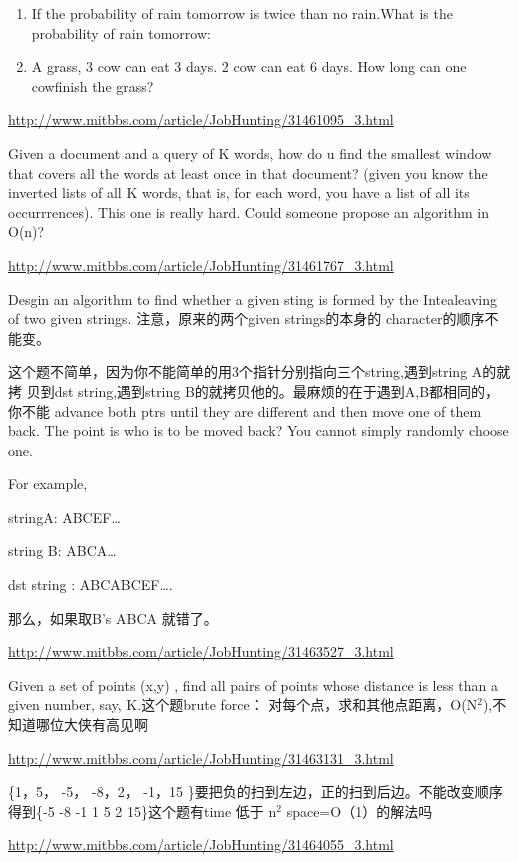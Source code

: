 \documentclass[12pt]{book}
\begin{document}
\begin{enumerate}
\item If the probability of rain tomorrow is twice than no rain.What is the probability of rain tomorrow:

\item A grass, 3 cow can eat 3 days. 2 cow can eat 6 days. How long can one cowfinish the grass?
\end{enumerate}

\url{http://www.mitbbs.com/article/JobHunting/31461095_3.html}

Given a document and a query of K words, how do u find the smallest window 
that covers all the words at least once in that document? (given you know 
the inverted lists of all K words, that is, for each word, you have a list 
of all its occurrrences). This one is really hard. Could someone propose an 
algorithm in O(n)?

\url{http://www.mitbbs.com/article/JobHunting/31461767_3.html}

Desgin an algorithm to find whether a given sting is formed by the 
Intealeaving of two given strings. 注意，原来的两个given strings的本身的
character的顺序不能变。

这个题不简单，因为你不能简单的用3个指针分别指向三个string,遇到string A的就拷
贝到dst string,遇到string B的就拷贝他的。最麻烦的在于遇到A,B都相同的，你不能
advance both ptrs until they are different and then move one of them back. 
The point is who is to be moved back? You cannot simply randomly choose one.

For example, 

stringA: ABCEF\ldots{}

string B: ABCA\ldots{}

dst string : ABCABCEF\ldots{}.

那么，如果取B's ABCA 就错了。

\url{http://www.mitbbs.com/article/JobHunting/31463527_3.html}

Given a set of points (x,y) , find all pairs of points whose distance is less than a given number, say, K.这个题brute force： 对每个点，求和其他点距离，O(N$^{\text{2}}$),不知道哪位大侠有高见啊

\url{http://www.mitbbs.com/article/JobHunting/31463131_3.html}

\{1，5， -5， -8，2，  -1，15 \}要把负的扫到左边，正的扫到后边。不能改变顺序得到\{-5 -8 -1 1 5 2 15\}这个题有time 低于 n$^{\text{2}}$ space=O（1）的解法吗

\url{http://www.mitbbs.com/article/JobHunting/31464055_3.html}
\end{document}
